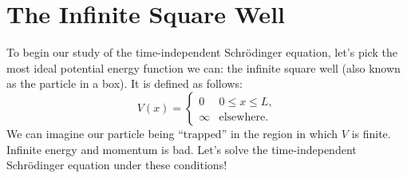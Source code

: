 \documentclass[../p052main.tex]{subfiles}
\begin{document}

\section{The Infinite Square Well}
To begin our study of the time-independent Schrödinger equation, let's pick the most ideal potential energy function we can: the infinite square well (also known as the particle in a box).
It is defined as follows:
\[ V(x) = \begin{cases} 0 & 0 \leq x \leq L, \\ \infty & \text{elsewhere}. \end{cases} \]
We can imagine our particle being ``trapped'' in the region in which $V$ is finite.
Infinite energy and momentum is bad.
Let's solve the time-independent Schrödinger equation under these conditions!
\end{document}
